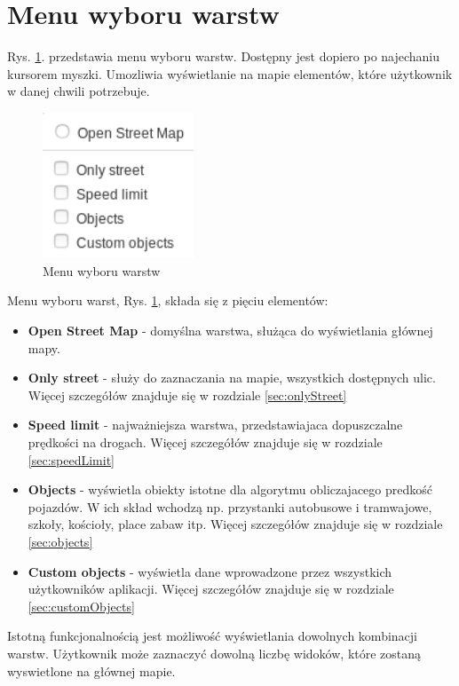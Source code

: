 \newpage

\section{Menu wyboru warstw}
\label{sec:layerMenu}

Rys. \ref{sec:mainLayerView}. przedstawia menu wyboru warstw. Dostępny jest dopiero po najechaniu kursorem myszki. Umozliwia wyświetlanie na mapie elementów, które użytkownik w danej chwili potrzebuje. 

\begin{figure}[h]
\caption{Menu wyboru warstw}
\label{sec:mainLayerView}
\centering
\includegraphics[width=0.4\textwidth]{layerMenu}
\end{figure}

Menu wyboru warst, Rys. \ref{sec:mainLayerView}, składa się z pięciu elementów:
\begin{itemize}
\item \textbf{Open Street Map} - domyślna warstwa, służąca do wyświetlania głównej mapy.
\item \textbf{Only street} - służy do zaznaczania na mapie, wszystkich dostępnych ulic. Więcej szczegółów znajduje się w rozdziale \ref{sec:onlyStreet}
\item \textbf{Speed limit} - najważniejsza warstwa, przedstawiajaca dopuszczalne prędkości na drogach. Więcej szczegółów znajduje się w rozdziale \ref{sec:speedLimit}
\item \textbf{Objects} - wyświetla obiekty istotne dla algorytmu obliczajacego predkość pojazdów. W ich skład wchodzą np. przystanki autobusowe i tramwajowe, szkoły, kościoły, place zabaw itp. Więcej szczegółów znajduje się w rozdziale \ref{sec:objects}
\item \textbf{Custom objects} - wyświetla dane wprowadzone przez wszystkich użytkowników aplikacji. Więcej szczegółów znajduje się w rozdziale \ref{sec:customObjects}
\end{itemize}

Istotną funkcjonalnością jest możliwość wyświetlania dowolnych kombinacji warstw. Użytkownik może zaznaczyć dowolną liczbę widoków, które zostaną wyswietlone na głównej mapie.

